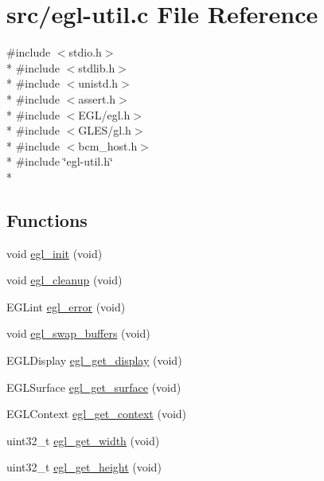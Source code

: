 \hypertarget{egl-util_8c}{}\section{src/egl-\/util.c File Reference}
\label{egl-util_8c}
{\ttfamily \#include $<$stdio.\+h$>$}\\*
{\ttfamily \#include $<$stdlib.\+h$>$}\\*
{\ttfamily \#include $<$unistd.\+h$>$}\\*
{\ttfamily \#include $<$assert.\+h$>$}\\*
{\ttfamily \#include $<$E\+G\+L/egl.\+h$>$}\\*
{\ttfamily \#include $<$G\+L\+E\+S/gl.\+h$>$}\\*
{\ttfamily \#include $<$bcm\+\_\+host.\+h$>$}\\*
{\ttfamily \#include \char`\"{}egl-\/util.\+h\char`\"{}}\\*
\subsection*{Functions}
\begin{DoxyCompactItemize}
\item 
void \hyperlink{egl-util_8c_abcd369898b2df54992c9432da23c6420}{egl\+\_\+init} (void)
\item 
void \hyperlink{egl-util_8c_ac5a71c68f26cf3a6f2308359ae3310a1}{egl\+\_\+cleanup} (void)
\item 
E\+G\+Lint \hyperlink{egl-util_8c_a3196b113c4cd43f8f15179cd7e9384f6}{egl\+\_\+error} (void)
\item 
void \hyperlink{egl-util_8c_adda4d601a726246d7e25ea003624d4db}{egl\+\_\+swap\+\_\+buffers} (void)
\item 
E\+G\+L\+Display \hyperlink{egl-util_8c_a3a132ec8cb5c0170d98e0f45153d0704}{egl\+\_\+get\+\_\+display} (void)
\item 
E\+G\+L\+Surface \hyperlink{egl-util_8c_ae8230d60c66dcaf2538f97f96dcef346}{egl\+\_\+get\+\_\+surface} (void)
\item 
E\+G\+L\+Context \hyperlink{egl-util_8c_a3e16721e576073b176ae5cf4b5ad1a39}{egl\+\_\+get\+\_\+context} (void)
\item 
uint32\+\_\+t \hyperlink{egl-util_8c_a08fd0922be4136a0b9648f32e8ddf4fe}{egl\+\_\+get\+\_\+width} (void)
\item 
uint32\+\_\+t \hyperlink{egl-util_8c_a36ec4f686ec497e0757b5701421ab495}{egl\+\_\+get\+\_\+height} (void)
\end{DoxyCompactItemize}


